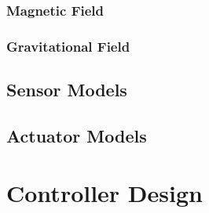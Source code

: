 \subsubsection{Magnetic Field}
\subsubsection{Gravitational Field}

\subsection{Sensor Models}

\subsection{Actuator Models}

\section{Controller Design}

